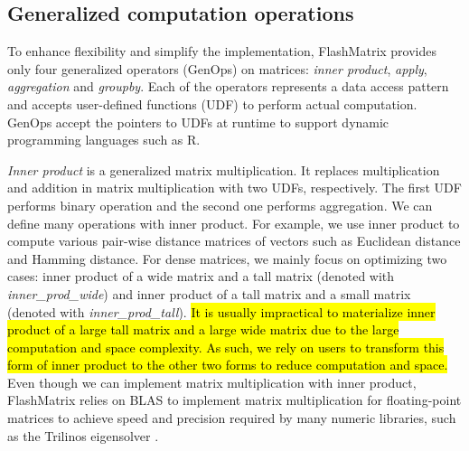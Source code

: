 

\subsection{Generalized computation operations} \label{sec:genop}
To enhance flexibility and simplify the implementation, FlashMatrix provides
only four generalized operators (GenOps) on matrices: \textit{inner product},
\textit{apply}, \textit{aggregation} and \textit{groupby}. Each of the operators
represents a data access pattern and accepts user-defined functions (UDF) to
perform actual computation. GenOps accept the pointers to UDFs at runtime
to support dynamic programming languages such as R.

\textit{Inner product} is a generalized matrix multiplication. It replaces
multiplication and addition in matrix multiplication with two UDFs,
respectively. The first UDF performs binary operation and the second one
performs aggregation. We can define many operations
with inner product. For example, we use inner product to compute various
pair-wise distance matrices of vectors such as Euclidean distance and
Hamming distance. For dense matrices, we mainly focus on
optimizing two cases: inner product of a wide matrix and a tall matrix (denoted
with \textit{inner\_prod\_wide}) and inner product of a tall matrix and a small
matrix (denoted with \textit{inner\_prod\_tall}). \hl{It is usually impractical to
materialize inner product of a large tall matrix and a large wide matrix due to
the large computation and space complexity. As such, we rely on users to
transform this form of inner product to the other two forms to reduce computation
and space.} Even though we can implement matrix multiplication with inner product,
FlashMatrix relies on BLAS to implement matrix multiplication for
floating-point matrices to achieve speed and precision required by
many numeric libraries, such as the Trilinos eigensolver \cite{anasazi, FlashEigen}.

